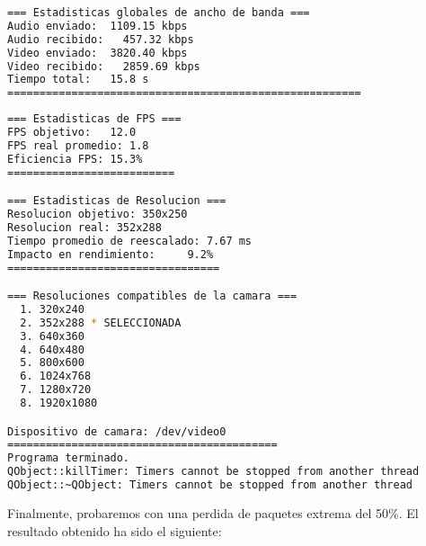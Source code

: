 \begin{adjustbox}{max width=\textwidth}
\begin{lstlisting}[language=bash,basicstyle=\ttfamily\scriptsize]
=== Estadisticas globales de ancho de banda ===
Audio enviado:	1109.15 kbps
Audio recibido:   457.32 kbps
Video enviado:	3820.40 kbps
Video recibido:   2859.69 kbps
Tiempo total: 	15.8 s
=======================================================
\end{lstlisting}
\end{adjustbox}

\begin{adjustbox}{max width=\textwidth}
\begin{lstlisting}[language=bash,basicstyle=\ttfamily\scriptsize]
=== Estadisticas de FPS ===
FPS objetivo: 	12.0
FPS real promedio: 1.8
Eficiencia FPS:	15.3%
==========================

=== Estadisticas de Resolucion ===
Resolucion objetivo: 350x250
Resolucion real: 352x288
Tiempo promedio de reescalado: 7.67 ms
Impacto en rendimiento:    	9.2%
=================================

=== Resoluciones compatibles de la camara ===
  1. 320x240
  2. 352x288 * SELECCIONADA
  3. 640x360
  4. 640x480
  5. 800x600
  6. 1024x768
  7. 1280x720
  8. 1920x1080

Dispositivo de camara: /dev/video0
==========================================
Programa terminado.
QObject::killTimer: Timers cannot be stopped from another thread
QObject::~QObject: Timers cannot be stopped from another thread
\end{lstlisting}
\end{adjustbox}
\vspace{\baselineskip}

\newpage

Finalmente, probaremos con una perdida de paquetes extrema del 50\%. El resultado obtenido ha sido el siguiente:
\vspace{\baselineskip}

